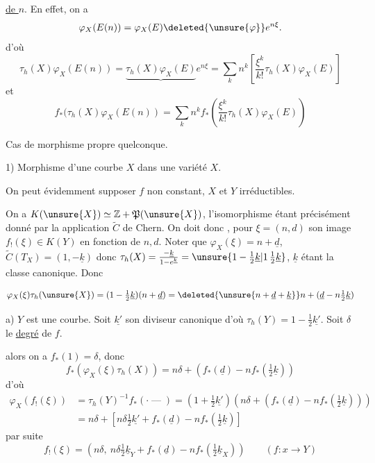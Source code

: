 
\uline{de \(n\)}. En effet, on a
\[
\varphi_X(E(n))=\varphi_X(E)\deleted{\unsure{\varphi}}e^{n\xi}.
\]
d'où
\[
\tau_h(X)\varphi_X(E(n))=\underbrace{\tau_h(X)\varphi_X(E)}e^{n\xi}=\sum_k n^k\left[\frac{\xi^k}{k!}\tau_h(X)\varphi_X(E)\right]
\]
et
\[
f_*(\tau_h(X)\varphi_X(E(n))=\sum_k n^k f_*\left(\frac{\xi^k}{k!}\tau_h(X)\varphi_X(E)\right)
\]


Cas de morphisme propre quelconque.

1) Morphisme d'une courbe   \(X\) dans une variété \(X\).

On peut évidemment supposer \(f\) non constant, \(X\) et \(Y\) irréductibles.


On a \(K(\unsure{X})\simeq\mathbb Z+\mathfrak P(\unsure{X})\),  l'isomorphisme étant précisément donné par la application \(\widetilde C\) de Chern. On doit donc , pour \(\xi=(n,d)\) son image \(f_!(\xi)\in K(Y)\) en fonction de \(n,d\). Noter que \(\varphi_X(\xi)=n+\underline d\), \(\widetilde C(T_X)=(1,-\underline k)\) donc \(\tau_h(X)=\frac{-\underline k}{1-e^{\underline k}}=\unsure{1-\tfrac12\underline k|1\,\tfrac12\underline k}\), \(\underline k\) étant la classe canonique. Donc

\[
\varphi_X(\xi)\tau_h(\unsure{X})=(1-\tfrac12\underline k)(n+\underline d)=\deleted{\unsure{n+\underline d+\underline k}}n+(\underline d-n\tfrac12\underline k)
\]

 a) \(Y\) est une courbe. Soit \(\underline{k'}\) son diviseur canonique d'où \(\tau_h(Y)=1-\tfrac12\underline{k'}\). Soit \(\delta\) le \uline{degré} de \(f\).

alors on a \(f_*(1)=\delta\), donc
\[
f_*(\varphi_X(\xi)\tau_h(X))=n\delta+\left(f_*(\underline d)-nf_*(\tfrac12\underline k)\right)
\]
d'où
\[
\begin{aligned}
\varphi_X(f_!(\xi))&=\tau_h(Y)^{-1}f_*(\mathord{\cdot}\mathbin{\text{---}})=(1+\tfrac12\underline{k'})(n\delta+(f_*(\underline d)-nf_*(\tfrac12\underline k)))\\
&=n\delta+\left[n\delta\tfrac12\underline{k'}+f_*(\underline d)-nf_*(\tfrac12\underline k)\right]
\end{aligned}
\]
par suite
\[
\boxed{f_!(\xi)=\left(n\delta,\ n\delta\tfrac12\underline{k}_Y+f_*(\underline d)-nf_*(\tfrac12\underline{k}_X)\right)}\qquad(f:x\longrightarrow Y)
\]

